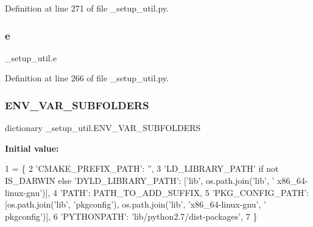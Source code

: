 Definition at line 271 of file \+\_\+setup\+\_\+util.\+py.

\mbox{\label{namespace__setup__util_acdce690b925de33d6249bbbfa1109d61}} 
\subsubsection{\texorpdfstring{e}{e}}
{\footnotesize\ttfamily \+\_\+setup\+\_\+util.\+e}



Definition at line 266 of file \+\_\+setup\+\_\+util.\+py.

\mbox{\label{namespace__setup__util_aa31804f1be8660156ce9394b33c68dc4}} 
\subsubsection{\texorpdfstring{E\+N\+V\+\_\+\+V\+A\+R\+\_\+\+S\+U\+B\+F\+O\+L\+D\+E\+RS}{ENV\_VAR\_SUBFOLDERS}}
{\footnotesize\ttfamily dictionary \+\_\+setup\+\_\+util.\+E\+N\+V\+\_\+\+V\+A\+R\+\_\+\+S\+U\+B\+F\+O\+L\+D\+E\+RS}

{\bfseries Initial value\+:}
\begin{DoxyCode}
1 =  \{
2     \textcolor{stringliteral}{'CMAKE\_PREFIX\_PATH'}: \textcolor{stringliteral}{''},
3     \textcolor{stringliteral}{'LD\_LIBRARY\_PATH'} \textcolor{keywordflow}{if} \textcolor{keywordflow}{not} IS\_DARWIN \textcolor{keywordflow}{else} \textcolor{stringliteral}{'DYLD\_LIBRARY\_PATH'}: [\textcolor{stringliteral}{'lib'}, os.path.join(\textcolor{stringliteral}{'lib'}, \textcolor{stringliteral}{'
      x86\_64-linux-gnu'})],
4     \textcolor{stringliteral}{'PATH'}: PATH\_TO\_ADD\_SUFFIX,
5     \textcolor{stringliteral}{'PKG\_CONFIG\_PATH'}: [os.path.join(\textcolor{stringliteral}{'lib'}, \textcolor{stringliteral}{'pkgconfig'}), os.path.join(\textcolor{stringliteral}{'lib'}, \textcolor{stringliteral}{'x86\_64-linux-gnu'}, \textcolor{stringliteral}{'
      pkgconfig'})],
6     \textcolor{stringliteral}{'PYTHONPATH'}: \textcolor{stringliteral}{'lib/python2.7/dist-packages'},
7 \}
\end{DoxyCode}


